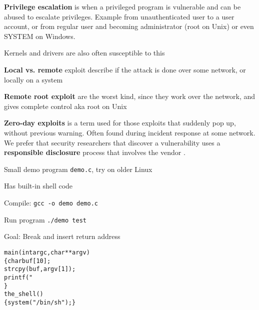 \documentclass[Screen16to9,17pt]{foils}
\begin{document}
\begin{list1}
\item {\bfseries Privilege escalation} is when a privileged program is vulnerable and can be abused to escalate privileges. Example from unauthenticated user to a user account, or from regular user and becoming administrator (root on Unix) or even SYSTEM on Windows.
\item Kernels and drivers are also often susceptible to this
\end{list1}


\begin{list1}
\item {\bfseries Local vs. remote} exploit describe if the attack is done over some network, or locally on a system
\item {\bfseries Remote root exploit}
are the worst kind, since they work over the network, and gives complete control aka root on Unix
\item {\bfseries Zero-day exploits} is a term used for those exploits that suddenly pop up, without previous warning. Often found during incident response at some network. We prefer that security researchers that discover a vulnerability uses a {\bf responsible disclosure} process that involves the vendor .
\end{list1}






\begin{list2}
\item Small demo program \verb+demo.c+, try on older Linux
\item Has built-in shell code
\item Compile:
\verb+gcc -o demo demo.c+
\item Run program
\verb+./demo test+
\item Goal: Break and insert return address
\end{list2}

\begin{alltt}\small
main(int argc, char **argv)
\{      char buf[10];
        strcpy(buf, argv[1]);
        printf("%s\textbackslash{}n",buf);
\}
the_shell()
\{  system("/bin/sh");  \}
\end{alltt}


\end{document}
